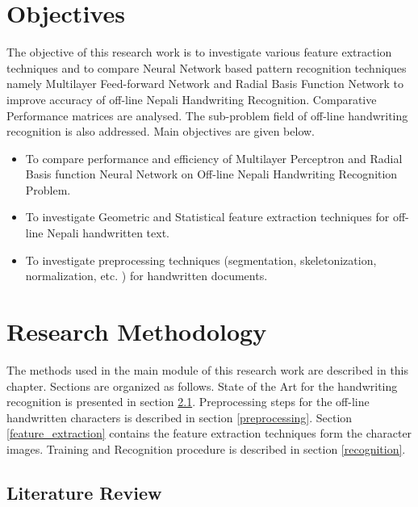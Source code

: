 \documentclass[12pt,a4paper,oneside]{article}
\numberwithin{equation}{section}
\numberwithin{algorithm}{section}
\begin{document}
\section{Objectives}
\label{objectives}
The objective of this research work is to investigate various feature extraction techniques and to compare Neural Network based pattern recognition techniques namely Multilayer Feed-forward Network and Radial Basis Function Network to improve accuracy of off-line Nepali Handwriting Recognition. Comparative Performance matrices are analysed. The sub-problem field of off-line handwriting recognition is also addressed. Main objectives are given below.
\begin{itemize}
\item  To compare performance and efficiency of Multilayer Perceptron and Radial Basis function Neural Network on Off-line Nepali Handwriting Recognition Problem.
\item To investigate Geometric and Statistical feature extraction techniques for off-line Nepali handwritten text.
\item To investigate preprocessing techniques (segmentation, skeletonization, normalization, etc. ) for handwritten documents.
\end{itemize}

\section{Research Methodology}
\label{research_methodology}

The methods used in the main module of this research work are described in this chapter. Sections are organized as follows. State of the Art for the handwriting recognition is presented in section \ref{literature_review}. Preprocessing steps for the off-line handwritten characters is described in section \ref{preprocessing}. Section \ref{feature_extraction} contains the feature extraction techniques form the character images. Training and Recognition procedure is described in section \ref{recognition}.

\subsection{Literature Review}
\label{literature_review}

\end{document}
